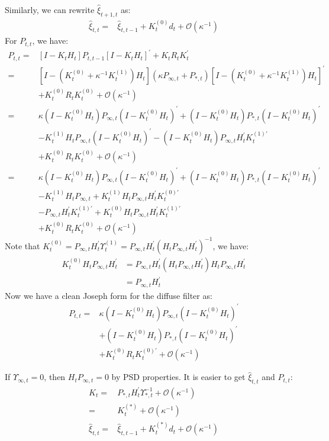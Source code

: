 \documentclass[12pt]{article}
\numberwithin{equation}{section}
\begin{document}
Similarly, we can rewrite $\hat{\xi}_{t+1,t}$ as:
\begin{align}
    \hat{\xi}_{t,t} =& \hat{\xi}_{t,t-1} + K_t^{(0)}d_t + \mathcal{O}(\kappa^{-1}) \label{eq:diff_xi1} 
\end{align}
For $P_{t,t}$, we have:
\begin{align*}
    P_{t,t} =& [I-K_tH_t]P_{t,t-1}[I-K_tH_t]^{'}+K_tR_tK_t^{'} \\
    =& [I-(K_t^{(0)}+\kappa^{-1}K_t^{(1)})H_t](\kappa P_{\infty,t}+P_{*,t})[I-(K_t^{(0)}+\kappa^{-1}K_t^{(1)})H_t]^{'} \\ 
    &+ K_t^{(0)}R_tK_t^{(0)} + \mathcal{O}(\kappa^{-1}) \\
    =& \kappa(I-K_t^{(0)}H_t)P_{\infty,t}(I-K_t^{(0)}H_t)^{'} + (I-K_t^{(0)}H_t)P_{*,t}(I-K_t^{(0)}H_t)^{'} \\
    &-K_t^{(1)}H_tP_{\infty,t}(I-K_t^{(0)}H_t)^{'} - (I-K_t^{(0)}H_t)P_{\infty,t}H_t^{'}K_t^{(1)'} \\
    &+ K_t^{(0)}R_tK_t^{(0)} + \mathcal{O}(\kappa^{-1}) \\
    =& \kappa(I-K_t^{(0)}H_t)P_{\infty,t}(I-K_t^{(0)}H_t)^{'} + (I-K_t^{(0)}H_t)P_{*,t}(I-K_t^{(0)}H_t)^{'} \\
    &-K_t^{(1)}H_tP_{\infty,t} + K_t^{(1)}H_tP_{\infty,t}H_t^{'}K_t^{(0)'} \\
    &- P_{\infty,t}H_t^{'}K_t^{(1)'} + K_t^{(0)}H_tP_{\infty,t}H_t^{'}K_t^{(1)'}  \\
    &+ K_t^{(0)}R_tK_t^{(0)} + \mathcal{O}(\kappa^{-1}) 
\end{align*}
Note that $K_t^{(0)} = P_{\infty,t}H_t^{'}\Upsilon_t^{(1)} = P_{\infty,t}H_t^{'}(H_tP_{\infty,t}H_t^{'})^{-1}$, we have:
\begin{align*}
    K_t^{(0)}H_tP_{\infty,t}H_t^{'} &= P_{\infty,t}H_t^{'}(H_tP_{\infty,t}H_t^{'})H_tP_{\infty,t}H_t^{'} \\
    &= P_{\infty,t}H_t^{'}
\end{align*}
Now we have a clean Joseph form for the diffuse filter as:
\begin{align}
    P_{t,t}=& \kappa (I-K_t^{(0)}H_t)P_{\infty,t}(I-K_t^{(0)}H_t)^{'} \label{eq:diff_P1} \\
    &+(I-K_t^{(0)}H_t)P_{*,t}(I-K_t^{(0)}H_t)^{'} \nonumber \\
    &+K_t^{(0)}R_tK_t^{(0)'} + \mathcal{O}(\kappa^{-1}) \nonumber
\end{align}

If $\Upsilon_{\infty,t}=0$, then $H_tP_{\infty,t}=0$ by PSD properties. It is easier to get $\hat{\xi}_{t,t}$ and $P_{t,t}$:
\begin{align}
    K_t =& P_{*,t}H_t^{'}\Upsilon_{*,t}^{-1} + \mathcal{O}(\kappa^{-1}) \nonumber \\
    =& K_t^{(*)} + \mathcal{O}(\kappa^{-1}) \label{eq:K2_diffuse} \\
    \hat{\xi}_{t,t} =& \hat{\xi}_{t,t-1} + K_t^{(*)}d_t + \mathcal{O}(\kappa^{-1}) \label{eq:diff_xi2} 
\end{align}
\end{document}
